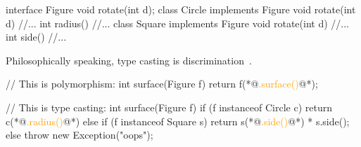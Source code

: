 \documentclass{article}
\begin{document}

\begin{pptWide}{2}
{\small\begin{ffcode}
interface Figure
  void rotate(int d);
class Circle implements Figure
  void rotate(int d) //...
  int radius() //...
class Square implements Figure
  void rotate(int d) //...
  int side() //...
\end{ffcode}
}
\par
Philosophically speaking, type casting is discrimination~\citep{bugayenko2020blog1110}.
\par\columnbreak\par
{\small\begin{ffcode}
// This is polymorphism:
int surface(Figure f)
  return f(*@\textcolor{orange}{.surface()}@*);

// This is type casting:
int surface(Figure f)
  if (f instanceof Circle c) {
    return c(*@\textcolor{orange}{.radius()}@*)
  } else if (f instanceof Square s) {
    return s(*@\textcolor{orange}{.side()}@*) * s.side();
  } else {
    throw new Exception("oops");
  }
\end{ffcode}
}
\end{pptWide}
\par
\plush{}
\end{document}

